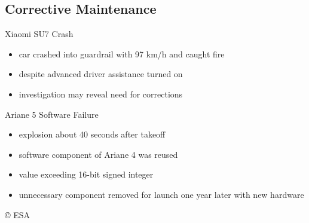\subsection{Corrective Maintenance}
\begin{frame}{\insertsubsection}
	\begin{fancycolumns}
		\begin{definition}{\insertsubsection\mysource{\lientzswanson}}
			 \hfill {}
		\end{definition}
		\begin{example}{Xiaomi SU7 Crash}
			\begin{itemize}
				\item car crashed into guardrail with 97 km/h and caught fire
				\item despite advanced driver assistance turned on
				\item investigation may reveal need for corrections
			\end{itemize}
			\centering{}
		\end{example}
	\nextcolumn
		\begin{example}{Ariane 5 Software Failure}
			\begin{itemize}
				\item explosion about 40 seconds after takeoff
				\item software component of Ariane 4 was reused
				\item value exceeding 16-bit signed integer
				\item unnecessary component removed for launch one year later with new hardware
			\end{itemize}
			\centering{} {\tiny\copyright{} ESA} %
		\end{example}
	\end{fancycolumns}
\end{frame}


